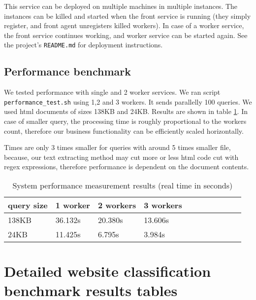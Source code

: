 \documentclass[a4paper]{article}
\begin{document}
This service can be deployed on multiple machines in multiple instances.
The instances can be killed and started when the front service is running
(they simply register, and front agent unregisters killed workers).
In case of a worker service, the front service continues working,
and worker service can be started again.
See the project's \texttt{README.md} for deployment instructions.



\subsection {Performance benchmark}
\label{perf}

We tested performance with single and 2 worker services.
We ran script \texttt{performance\_test.sh} using 1,2 and 3 workers.
It sends parallelly 100 queries.
We used html documents of sizes 138KB and 24KB.
Results are shown in table \ref{table:perf}.
In case of smaller query, the processing time is roughly proportional to the workers count,
therefore our business functionality can be efficiently scaled horizontally.

Times are only 3 times smaller for queries with around 5 times smaller file,
because, our text extracting method may cut
more or less html code cut with regex expressions,
therefore performance is dependent on the document contents.

\begin{table}[!hbt]
    \caption{ System performance measurement results (real time in seconds)
    \label{table:perf}
    }
\footnotesize
\begin{center}
    \begin{tabular}{|l|l|l|l|l|l|l|l|l|l|l|}
    \hline
        query size & 1 worker & 2 workers & 3 workers\\
    \hline
        138KB & 36.132s&20.380s&13.606s\\
    \hline
        24KB &11.425s&6.795s&3.984s\\
    \hline
    \end{tabular}
\end{center}
\end{table}

\newpage
\appendix
\section{Detailed website classification benchmark results tables}
% 

\end{document}
